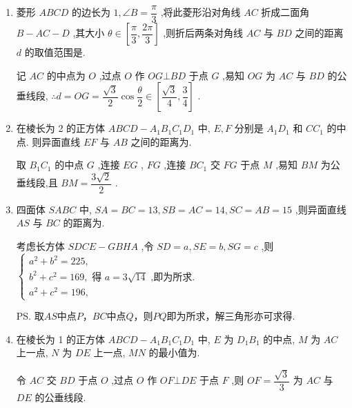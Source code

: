 \begin{enumerate}
    \item 菱形 ${ABCD}$ 的边长为 $1,\angle B = \dfrac{\pi }{3}$ ,将此菱形沿对角线 ${AC}$ 折成二面角 $B - {AC} - D$ ,其大小 $\theta  \in  \left\lbrack  {\dfrac{\pi }{3},\dfrac{2\pi }{3}}\right\rbrack$ ,则折后两条对角线 ${AC}$ 与 ${BD}$ 之间的距离 $d$ 的取值范围是.
    \begin{jieda}
        记 ${AC}$ 的中点为 $O$ ,过点 $O$ 作 ${OG} \bot  {BD}$ 于点 $G$ ,易知 ${OG}$ 为 ${AC}$ 与 ${BD}$ 的公垂线段, $\therefore d = {OG} = \dfrac{\sqrt{3}}{2}\cos \dfrac{\theta }{2} \in  \left\lbrack  {\dfrac{\sqrt{3}}{4},\dfrac{3}{4}}\right\rbrack$ .
    \end{jieda}
    
    \item 在棱长为 2 的正方体 ${ABCD} - {A}_{1}{B}_{1}{C}_{1}{D}_{1}$ 中, $E,F$ 分别是 ${A}_{1}{D}_{1}$ 和 $C{C}_{1}$ 的中点. 则异面直线 ${EF}$ 与 ${AB}$ 之间的距离为.
    \begin{jieda}
        取 ${B}_{1}{C}_{1}$ 的中点 $G$ ,连接 ${EG}$ , ${FG}$ ,连接 $B{C}_{1}$ 交 ${FG}$ 于点 $M$ ,易知 ${BM}$ 为公垂线段,且 ${BM} = \dfrac{3\sqrt{2}}{2}$ .
    \end{jieda}
    
    \item 四面体 ${SABC}$ 中, ${SA} = {BC} = {13},{SB} = {AC} = {14},{SC} = {AB} = {15}$ ,则异面直线 ${AS}$ 与 ${BC}$ 的距离为.
    \begin{jieda}
        考虑长方体 ${SDCE} - {GBHA}$ ,令 ${SD} = a,{SE} = b,{SG} = c$ ,则 $\left\{  \begin{array}{l} {a}^{2} + {b}^{2} = {225}, \\  {b}^{2} + {c}^{2} = {169},\text{ 得 }a = 3\sqrt{14}\text{ ,即为所求. } \\  {a}^{2} + {c}^{2} = {196}, \end{array}\right.$ 

        \ps 取$AS$中点$P$，$BC$中点$Q$，则$PQ$即为所求，解三角形亦可求得.
    \end{jieda}
    
    \item 在棱长为 1 的正方体 ${ABCD} - {A}_{1}{B}_{1}{C}_{1}{D}_{1}$ 中, $E$ 为 ${D}_{1}{B}_{1}$ 的中点, $M$ 为 ${AC}$ 上一点, $N$ 为 ${DE}$ 上一点, ${MN}$ 的最小值为.
    \begin{jieda}
        令 ${AC}$ 交 ${BD}$ 于点 $O$ ,过点 $O$ 作 ${OF}\bot {DE}$ 于点 $F$ ,则 ${OF} = \dfrac{\sqrt{3}}{3}$ 为 ${AC}$ 与 ${DE}$ 的公垂线段.
    \end{jieda}


\end{enumerate}
